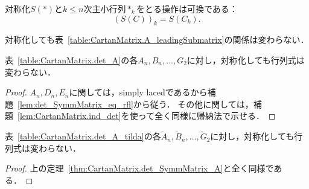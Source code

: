 \begin{lemma}
  \label{lem:SymmMatrix_leadingSubmatrix_comm}
  \leanok
  対称化$S(*)$と$k \le n$次主小行列$*_k$をとる操作は可換である：
  \begin{equation}
    (S(C))_k = S(C_k).
  \end{equation}
\end{lemma}

\begin{lemma}
  \label{lem:CartanMatrix.SymmMatrix_A_isTopLeftBlock}
  \leanok
  対称化しても表~\ref{table:CartanMatrix.A_leadingSubmatrix}の関係は変わらない．
\end{lemma}

\begin{theorem}
  \label{thm:CartanMatrix.det_SymmMatrix_A}
  \leanok
  表~\ref{table:CartanMatrix.det_A}の各$A_n, B_n, \ldots, G_2$に対し，対称化しても行列式は変わらない．
\end{theorem}

\begin{proof}
  $A_n, D_n, E_n$に関しては，simply lacedであるから補題~\ref{lem:det_SymmMatrix_eq_rfl}から従う．
  その他に関しては，補題~\ref{lem:CartanMatrix.ind_det}を使って全く同様に帰納法で示せる．
\end{proof}

\begin{theorem}
  \label{thm:CartanMatrix.det_SymmMatrix_A_tilda}
  \leanok
  表~\ref{table:CartanMatrix.det_A_tilda}の各$\widetilde{A}_n, \widetilde{B}_n, \ldots, \widetilde{G}_2$に対し，対称化しても行列式は変わらない．
\end{theorem}

\begin{proof}
  上の定理~\ref{thm:CartanMatrix.det_SymmMatrix_A}と全く同様である．
\end{proof}